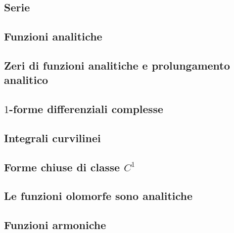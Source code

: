 \documentclass{article}
\begin{document}
\subsection{Serie}


\subsection{Funzioni analitiche}


\subsection{Zeri di funzioni analitiche e prolungamento analitico}


\subsection{$1$-forme differenziali complesse}


\subsection{Integrali curvilinei}


\subsection{Forme chiuse di classe $C^1$}


\subsection{Le funzioni olomorfe sono analitiche}


\subsection{Funzioni armoniche}

\end{document}
